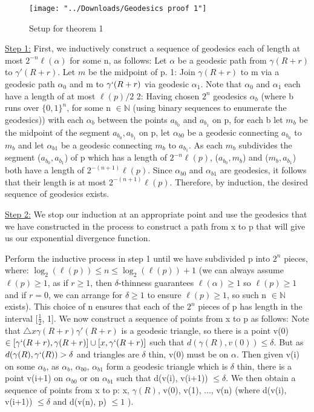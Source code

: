 \documentclass[11pt]{article}
\newcommand{\vs}{\vskip10pt}
\begin{document}
		\begin{figure}[h]
		\centering
		\texttt{[image: "../Downloads/Geodesics proof 1"]}
		\caption{Setup for theorem 1}
		\label{Figure 4: Setup for theorem 1}
		
	\end{figure}
	
	\vs
	
	\underline{Step 1:}
	\vs
	First, we inductively construct a sequence of geodesics each of length at most $2^{-n} \ell(\alpha)$ for some n, as follows: 
	Let $\alpha$ be a geodesic path from $\gamma(R+r)$ to $\gamma'(R+r)$. Let $m$ be the midpoint of p. 
	\vs
	1: Join $\gamma(R+r)$ to m via a geodesic path $\alpha_0$ and m to $\gamma`(R+r)$ via geodesic $\alpha_1$. Note that $\alpha_0$ and $\alpha_1$ each have a length of at most $\ell(p)/2$
	\vs
	2: Having chosen $2^n$ geodesics $\alpha_b$ (where b runs over $\{0,1\}^n$, for some n $\in \mathbb{N}$ (using binary sequences to enumerate the geodesics)) with each $\alpha_b$ between the points $a_{b_0}$ and $a_{b_1}$ on p, for each b let $m_b$ be the midpoint of the segment $a_{b_0},a_{b_1}$ on p, let $\alpha_{b0}$ be a geodesic connecting $a_{b_0}$ to $m_b$ and let $\alpha_{b1}$ be a geodesic connecting $m_b$ to $a_{b_1}$. As each $m_b$ subdivides the segment ($a_{b_0}, a_{b_1}$) of p which has a length of $2^{-n} \ell(p)$, ($a_{b_0}, m_b$) and ($m_b, a_{b_1}$) both have a length of $2^{-(n+1)}\ell(p)$. Since $\alpha_{b0}$ and $\alpha_{b1}$ are geodesics, it follows that their length is at most $2^{-(n+1)}\ell(p)$. 
	\vs
	Therefore, by induction, the desired sequence of geodesics exists. 
	\vs 
	
	\underline{Step 2:} 
	\vs
	We stop our induction at an appropriate point and use the geodesics that we have constructed in the process to construct a path from x to p that will give us our exponential divergence function. 
	\vs 
	
	Perform the inductive process in step 1 until we have subdivided p into $2^n$ pieces, where: $\log_2(\ell(p)) \leq n \leq \log_2(\ell(p)) + 1$ (we can always assume $\ell(p) \geq 1$, as if $r \geq 1$, then $\delta$-thinness guarantees $\ell(\alpha) \geq 1$ so $\ell(p) \geq 1$ and if $r = 0$, we can arrange for $\delta \geq 1$ to ensure $\ell(p) \geq 1$, so such n $\in \mathbb{N}$ exists). This choice of n ensures that each of the $2^n$ pieces of p has length in the interval [$\frac{1}{2}$, 1].
	\vs
	We now construct a sequence of points from x to p as follows: 
	\vs
	Note that $\triangle x \gamma(R+r) \gamma'(R+r)$ is a geodesic triangle, so there is a point v(0) $\in [\gamma`(R+r), \gamma(R+r)] \cup [x, \gamma`(R+r)]$ such that $d(\gamma(R), v(0)) \leq \delta$. But as $d(\gamma(R), \gamma`(R)) > \delta $ and triangles are $\delta$ thin, v(0) must be on $\alpha$. 
	\vs
	Then given v(i) on some $\alpha_{b}$, as $\alpha_{b}$, $\alpha_{b0}$, $\alpha_{b1}$ form a geodesic triangle which is $\delta $ thin, there is a point v(i+1) on $\alpha_{b0}$ or on $\alpha_{b1}$ such that d(v(i), v(i+1)) $\leq \delta$. 
	\vs
	We then obtain a sequence of points from x to p: x, $\gamma(R)$, v(0), v(1), ..., v(n) (where d(v(i), v(i+1)) $\leq \delta$ and d(v(n), p) $\leq 1$ ). 
	
\end{document}
